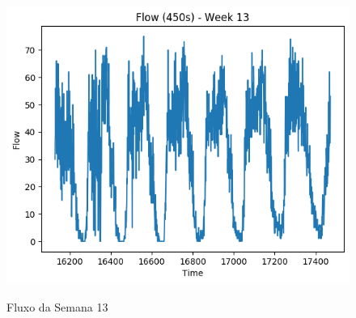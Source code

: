 \begin{figure}[h]
    \centering
    \includegraphics[scale=0.9]{monography/img/flows/flow_450_week_13.png}
    \label{figure:flow_450_week_13}
    \caption{Fluxo da Semana 13}
\end{figure}